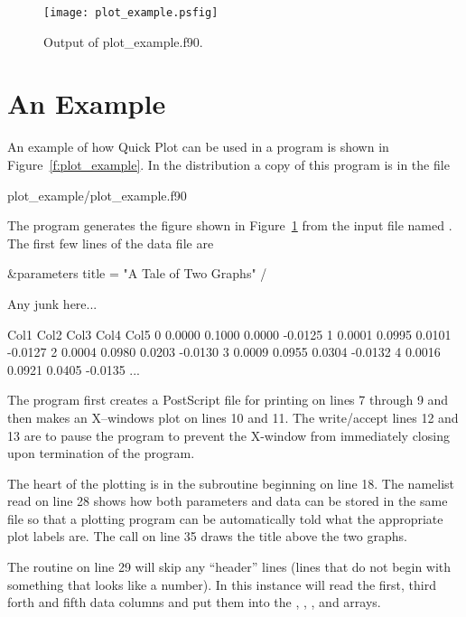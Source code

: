 \begin{figure}
\centering
\texttt{[image: plot\_example.psfig]}
\caption{Output of plot\_example.f90.}
\label{f:plot_out}
\end{figure}

\section{An Example}
\label{s:plot_example}

An example of how Quick Plot can be used in a program is shown in
Figure~\ref{f:plot_example}. In the \bmad distribution a copy of this
program is in the file
\begin{example}
  plot_example/plot_example.f90
\end{example}
The  program generates the figure shown in
Figure~\ref{f:plot_out} from the input file named . The
first few lines of the data file are
\begin{example}
  \&parameters
    title = "A Tale of Two Graphs"
  /
 
  Any junk here...
 
  Col1      Col2      Col3      Col4      Col5
     0    0.0000    0.1000    0.0000   -0.0125
     1    0.0001    0.0995    0.0101   -0.0127
     2    0.0004    0.0980    0.0203   -0.0130
     3    0.0009    0.0955    0.0304   -0.0132
     4    0.0016    0.0921    0.0405   -0.0135
     ...
\end{example}

The program first creates a PostScript file for printing on lines 7
through 9 and then makes an X--windows plot on lines 10 and 11. The
write/accept lines 12 and 13 are to pause the program to prevent the
X-window from immediately closing upon termination of the program.

The heart of the plotting is in the subroutine  beginning
on line 18. The namelist read on line 28 shows how both parameters and
data can be stored in the same file so that a plotting program can be
automatically told what the appropriate plot labels are. The
 call on line 35 draws the title above the two graphs.

The  routine on line 29 will skip any ``header''
lines (lines that do not begin with something that looks like a
number). In this instance  will read the first, third
forth and fifth data columns and put them into the , ,
, and  arrays.

